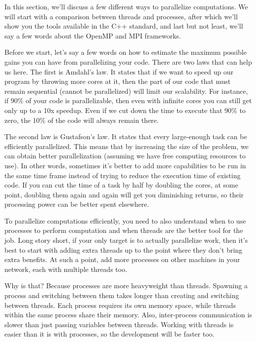 
In this section, we'll discuss a few different ways to parallelize computations. We will start with a comparison between threads and processes, after which we'll show you the tools available in the C++ standard, and last but not least, we'll say a few words about the OpenMP and MPI frameworks.

Before we start, let's say a few words on how to estimate the maximum possible gains you can have from parallelizing your code. There are two laws that can help us here. The first is Amdahl's law. It states that if we want to speed up our program by throwing more cores at it, then the part of our code that must remain sequential (cannot be parallelized) will limit our scalability. For instance, if 90\% of your code is parallelizable, then even with infinite cores you can still get only up to a 10x speedup. Even if we cut down the time to execute that 90\% to zero, the 10\% of the code will always remain there.

The second law is Gustafson's law. It states that every large-enough task can be efficiently parallelized. This means that by increasing the size of the problem, we can obtain better parallelization (assuming we have free computing resources to use). In other words, sometimes it's better to add more capabilities to be run in the same time frame instead of trying to reduce the execution time of existing code. If you can cut the time of a task by half by doubling the cores, at some point, doubling them again and again will get you diminishing returns, so their processing power can be better spent elsewhere.


To parallelize computations efficiently, you need to also understand when to use processes to perform computation and when threads are the better tool for the job. Long story short, if your only target is to actually parallelize work, then it's best to start with adding extra threads up to the point where they don't bring extra benefits. At such a point, add more processes on other machines in your network, each with multiple threads too.

Why is that? Because processes are more heavyweight than threads. Spawning a process and switching between them takes longer than creating and switching between threads. Each process requires its own memory space, while threads within the same process share their memory. Also, inter-process communication is slower than just passing variables between threads. Working with threads is easier than it is with processes, so the development will be faster too.

